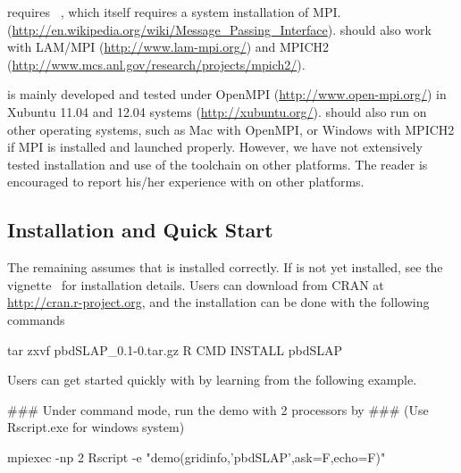 requires ~\citep{Chen2012pbdMPIpackage}, which
itself requires a system installation of MPI.
(\url{http://en.wikipedia.org/wiki/Message_Passing_Interface}).
 should also
work with LAM/MPI (\url{http://www.lam-mpi.org/}) and
MPICH2 (\url{http://www.mcs.anl.gov/research/projects/mpich2/}).

 is mainly developed and tested under
{\color{blue} OpenMPI} (\url{http://www.open-mpi.org/}) in
Xubuntu 11.04 and 12.04 systems (\url{http://xubuntu.org/}).
 should also run on other operating systems, such as
Mac with OpenMPI, or Windows with MPICH2 if MPI is installed and launched
properly.  However, we have not extensively tested installation and use of
the  toolchain on other platforms. 
The reader is encouraged to report his/her experience with 
on other platforms.


\subsection[Installation and Quick Start]{Installation and Quick Start}
\label{sec:installation}

The remaining assumes that  is installed correctly.
If  is not yet installed, see the 
vignette~\citep{Chen2012pbdMPIvignette} for installation details.
Users can download  from CRAN at
\url{http://cran.r-project.org}, and
the installation can be done with the following commands
\begin{Command}
tar zxvf pbdSLAP_0.1-0.tar.gz
R CMD INSTALL pbdSLAP
\end{Command}

Users can get started quickly with  by learning from the
following example.
\begin{Command}
### Under command mode, run the demo with 2 processors by
### (Use Rscript.exe for windows system)

mpiexec -np 2 Rscript -e "demo(gridinfo,'pbdSLAP',ask=F,echo=F)"
\end{Command}

